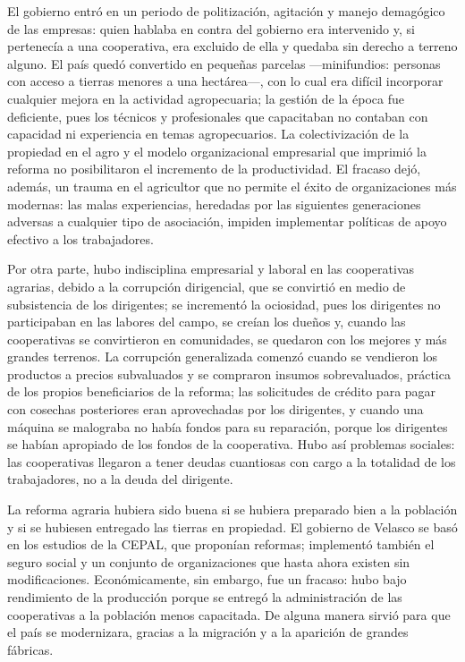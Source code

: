 \documentclass[
  man,
  floatsintext,
  longtable,
  a4paper,
  nolmodern,
  notxfonts,
  notimes,
  12pt,
  colorlinks=true,linkcolor=blue,citecolor=blue,urlcolor=blue]{apa7}
\begin{document}
El gobierno entró en un periodo de politización, agitación y manejo
demagógico de las empresas: quien hablaba en contra del gobierno era
intervenido y, si pertenecía a una cooperativa, era excluido de ella y
quedaba sin derecho a terreno alguno. El país quedó convertido en
pequeñas parcelas ---minifundios: personas con acceso a tierras menores
a una hectárea---, con lo cual era difícil incorporar cualquier mejora
en la actividad agropecuaria; la gestión de la época fue deficiente,
pues los técnicos y profesionales que capacitaban no contaban con
capacidad ni experiencia en temas agropecuarios. La colectivización de
la propiedad en el agro y el modelo organizacional empresarial que
imprimió la reforma no posibilitaron el incremento de la productividad.
El fracaso dejó, además, un trauma en el agricultor que no permite el
éxito de organizaciones más modernas: las malas experiencias, heredadas
por las siguientes generaciones adversas a cualquier tipo de asociación,
impiden implementar políticas de apoyo efectivo a los trabajadores.

Por otra parte, hubo indisciplina empresarial y laboral en las
cooperativas agrarias, debido a la corrupción dirigencial, que se
convirtió en medio de subsistencia de los dirigentes; se incrementó la
ociosidad, pues los dirigentes no participaban en las labores del campo,
se creían los dueños y, cuando las cooperativas se convirtieron en
comunidades, se quedaron con los mejores y más grandes terrenos. La
corrupción generalizada comenzó cuando se vendieron los productos a
precios subvaluados y se compraron insumos sobrevaluados, práctica de
los propios beneficiarios de la reforma; las solicitudes de crédito para
pagar con cosechas posteriores eran aprovechadas por los dirigentes, y
cuando una máquina se malograba no había fondos para su reparación,
porque los dirigentes se habían apropiado de los fondos de la
cooperativa. Hubo así problemas sociales: las cooperativas llegaron a
tener deudas cuantiosas con cargo a la totalidad de los trabajadores, no
a la deuda del dirigente.

La reforma agraria hubiera sido buena si se hubiera preparado bien a la
población y si se hubiesen entregado las tierras en propiedad. El
gobierno de Velasco se basó en los estudios de la CEPAL, que proponían
reformas; implementó también el seguro social y un conjunto de
organizaciones que hasta ahora existen sin modificaciones.
Económicamente, sin embargo, fue un fracaso: hubo bajo rendimiento de la
producción porque se entregó la administración de las cooperativas a la
población menos capacitada. De alguna manera sirvió para que el país se
modernizara, gracias a la migración y a la aparición de grandes
fábricas.
\end{document}
